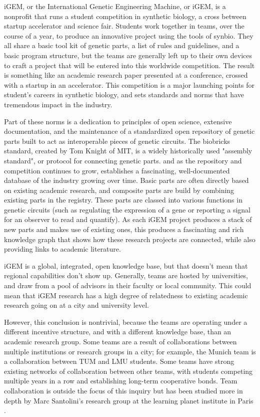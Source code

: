 \documentclass[12pt,a4paper]{article}
\begin{document}
	iGEM, or the International Genetic Engineering Machine, or iGEM, is a nonprofit that runs a student competition in synthetic biology, a cross between startup accelerator and science fair. Students work together in teams, over the course of a year, to produce an innovative project using the tools of synbio. They all share a basic tool kit of genetic parts, a list of rules and guidelines, and a basic program structure, but the teams are generally left up to their own devices to craft a project that will be entered into this worldwide competition. The result is something like an academic research paper presented at a conference, crossed with a startup in an accelerator. This competition is a major launching points for student's careers in synthetic biology, and sets standards and norms that have tremendous impact in the industry.
	
	Part of these norms is a dedication to principles of open science, extensive documentation, and the maintenance of a standardized open repository of genetic parts built to act as interoperable pieces of genetic circuits. The biobricks standard, created by Tom Knight of MIT, is a widely historically used "assembly standard", or protocol for connecting genetic parts. and as the repository and competition continues to grow, establishes a fascinating, well-documented database of the industry growing over time. Basic parts are often directly based on existing academic research, and composite parts are build by combining existing parts in the registry. These parts are classed into various functions in genetic circuits (such as regulating the expression of a gene or reporting a signal for an observer to read and quantify). As each iGEM project produces a stack of new parts and makes use of existing ones, this produces a fascinating and rich knowledge graph that shows how these research projects are connected, while also providing links to academic literature.
	
	iGEM is a global, integrated, open knowledge base, but that doesn't mean that regional capabilities don't show up. Generally, teams are hosted by universities, and draw from a pool of advisors in their faculty or local community. This could mean that iGEM research has a high degree of relatedness to existing academic research going on at a city and university level.
	
	However, this conclusion is nontrivial, because the teams are operating under a different incentive structure, and with a different knowledge base, than an academic research group. Some teams are a result of collaborations between multiple institutions or research groups in a city; for example, the Munich team is a collaboration between TUM and LMU students. Some teams have strong existing networks of collaboration between other teams, with students competing multiple years in a row and establishing long-term cooperative bonds. Team collaboration is outside the focus of this inquiry but has been studied more in depth by Marc Santolini's research group at the learning planet institute in Paris \parencite{santoliniIGEMModelSystem2023}.
	
\end{document}
